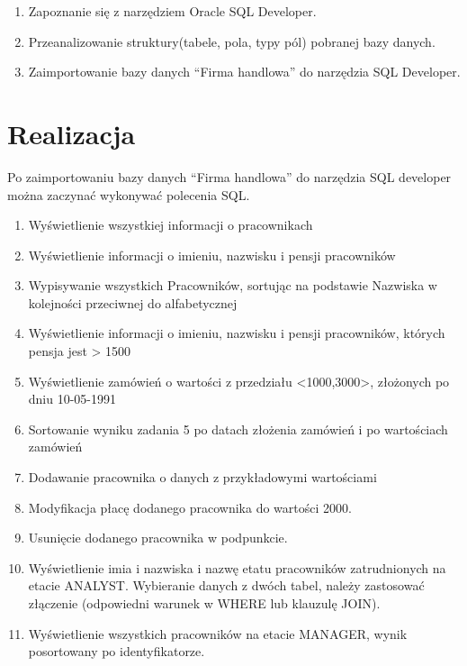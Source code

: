 \documentclass[a4paper, 10pt]{article}
\begin{document}
\begin{enumerate}
\item Zapoznanie się z narzędziem Oracle SQL Developer.
\item Przeanalizowanie struktury(tabele, pola, typy pól) pobranej bazy danych.
\item Zaimportowanie bazy danych ``Firma handlowa'' do narzędzia SQL Developer.
\end{enumerate}

\section{Realizacja}

Po zaimportowaniu bazy danych ``Firma handlowa'' do narzędzia SQL developer można zaczynać wykonywać polecenia SQL.

\begin{enumerate}
\item Wyświetlienie wszystkiej informacji o pracownikach 
\item Wyświetlienie informacji o imieniu, nazwisku i pensji pracowników
\item Wypisywanie wszystkich Pracowników, sortując na podstawie Nazwiska w kolejności przeciwnej do alfabetycznej
\item Wyświetlienie informacji o imieniu, nazwisku i pensji pracowników, których pensja jest > 1500
\item Wyświetlienie zamówień o wartości z przedziału <1000,3000>, złożonych po dniu 10-05-1991
\item Sortowanie wyniku zadania 5 po datach złożenia zamówień i po wartościach zamówień
\item Dodawanie pracownika o danych z przykładowymi wartościami
\item Modyfikacja płacę dodanego pracownika do wartości 2000. 
\item Usunięcie dodanego pracownika w podpunkcie. 
\item Wyświetlienie imia i nazwiska i nazwę etatu pracowników zatrudnionych na etacie  ANALYST. Wybieranie danych z dwóch tabel, należy zastosować złączenie (odpowiedni warunek w WHERE lub klauzulę JOIN). 
\item Wyświetlienie wszystkich pracowników na etacie MANAGER, wynik posortowany po identyfikatorze.
\end{enumerate}
\end{document}
